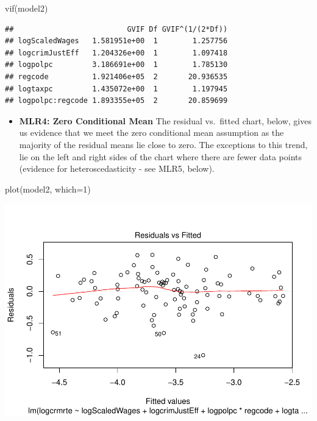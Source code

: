 \documentclass[]{article}
\newenvironment{Shaded}{}{}
\newcommand{\DataTypeTok}[1]{#1}
\newcommand{\DecValTok}[1]{#1}
\newcommand{\KeywordTok}[1]{\textcolor[rgb]{0.00,0.00,1.00}{#1}}
\newcommand{\NormalTok}[1]{#1}
\providecommand{\tightlist}{%
  \setlength{\itemsep}{0pt}\setlength{\parskip}{0pt}}
\begin{document}
\begin{Shaded}
\begin{Highlighting}[]
\KeywordTok{vif}\NormalTok{(model2)}
\end{Highlighting}
\end{Shaded}

\begin{verbatim}
##                          GVIF Df GVIF^(1/(2*Df))
## logScaledWages   1.581951e+00  1        1.257756
## logcrimJustEff   1.204326e+00  1        1.097418
## logpolpc         3.186691e+00  1        1.785130
## regcode          1.921406e+05  2       20.936535
## logtaxpc         1.435072e+00  1        1.197945
## logpolpc:regcode 1.893355e+05  2       20.859699
\end{verbatim}

\begin{itemize}
\tightlist
\item
  \textbf{MLR4: Zero Conditional Mean} The residual vs.~fitted chart,
  below, gives us evidence that we meet the zero conditional mean
  assumption as the majority of the residual means lie close to zero.
  The exceptions to this trend, lie on the left and right sides of the
  chart where there are fewer data points (evidence for
  heteroscedasticity - see MLR5, below).
\end{itemize}

\begin{Shaded}
\begin{Highlighting}[]
\KeywordTok{plot}\NormalTok{(model2, }\DataTypeTok{which=}\DecValTok{1}\NormalTok{)}
\end{Highlighting}
\end{Shaded}

\includegraphics{Bagnard_Gaustad_Hartman_Leung_Lab_3_files/figure-latex/unnamed-chunk-74-1.pdf}
\end{document}
